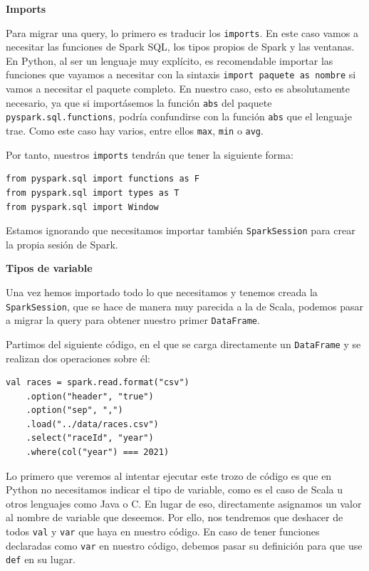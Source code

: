 \documentclass[12pt,twoside,titlepage]{report}
\begin{document}
\textbf{Imports}

Para migrar una query, lo primero es traducir los \texttt{imports}. En este caso vamos a necesitar las funciones de Spark SQL, los tipos propios de Spark y las ventanas. En Python, al ser un lenguaje muy explícito, es recomendable importar las funciones que vayamos a necesitar con la sintaxis \texttt{import {paquete} as {nombre}} si vamos a necesitar el paquete completo. En nuestro caso, esto es absolutamente necesario, ya que si importásemos la función \texttt{abs} del paquete \texttt{pyspark.sql.functions}, podría confundirse con la función \texttt{abs} que el lenguaje trae. Como este caso hay varios, entre ellos \texttt{max}, \texttt{min} o \texttt{avg}.

Por tanto, nuestros \texttt{imports} tendrán que tener la siguiente forma:

\begin{lstlisting}
from pyspark.sql import functions as F
from pyspark.sql import types as T
from pyspark.sql import Window
\end{lstlisting}

Estamos ignorando que necesitamos importar también \texttt{SparkSession} para crear la propia sesión de Spark.

\textbf{Tipos de variable}

Una vez hemos importado todo lo que necesitamos y tenemos creada la \texttt{SparkSession}, que se hace de manera muy parecida a la de Scala, podemos pasar a migrar la query para obtener nuestro primer \texttt{DataFrame}.

Partimos del siguiente código, en el que se carga directamente un \texttt{DataFrame} y se realizan dos operaciones sobre él:

\begin{lstlisting}
val races = spark.read.format("csv")
	.option("header", "true")
	.option("sep", ",")
	.load("../data/races.csv")
	.select("raceId", "year")
	.where(col("year") === 2021)
\end{lstlisting}

Lo primero que veremos al intentar ejecutar este trozo de código es que en Python no necesitamos indicar el tipo
de variable, como es el caso de Scala u otros lenguajes como Java o C. En lugar de eso, directamente asignamos un valor al nombre de variable que deseemos. Por ello, nos tendremos que deshacer de todos \texttt{val} y \texttt{var} que haya en nuestro código. En caso de tener funciones declaradas como \texttt{var} en nuestro código, debemos pasar su definición para que use \texttt{def} en su lugar.
\end{document}
